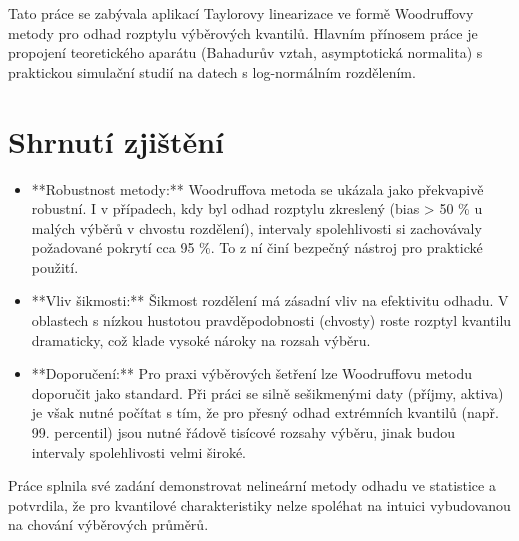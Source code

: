 Tato práce se zabývala aplikací Taylorovy linearizace ve formě Woodruffovy metody pro odhad rozptylu výběrových kvantilů. Hlavním přínosem práce je propojení teoretického aparátu (Bahadurův vztah, asymptotická normalita) s praktickou simulační studií na datech s log-normálním rozdělením.

\section*{Shrnutí zjištění}
\begin{itemize}
    \item **Robustnost metody:** Woodruffova metoda se ukázala jako překvapivě robustní. I v případech, kdy byl odhad rozptylu zkreslený (bias > 50 \% u malých výběrů v chvostu rozdělení), intervaly spolehlivosti si zachovávaly požadované pokrytí cca 95 \%. To z ní činí bezpečný nástroj pro praktické použití.
    \item **Vliv šikmosti:** Šikmost rozdělení má zásadní vliv na efektivitu odhadu. V oblastech s nízkou hustotou pravděpodobnosti (chvosty) roste rozptyl kvantilu dramaticky, což klade vysoké nároky na rozsah výběru.
    \item **Doporučení:** Pro praxi výběrových šetření lze Woodruffovu metodu doporučit jako standard. Při práci se silně sešikmenými daty (příjmy, aktiva) je však nutné počítat s tím, že pro přesný odhad extrémních kvantilů (např. 99. percentil) jsou nutné řádově tisícové rozsahy výběru, jinak budou intervaly spolehlivosti velmi široké.
\end{itemize}

Práce splnila své zadání demonstrovat nelineární metody odhadu ve statistice a potvrdila, že pro kvantilové charakteristiky nelze spoléhat na intuici vybudovanou na chování výběrových průměrů.
